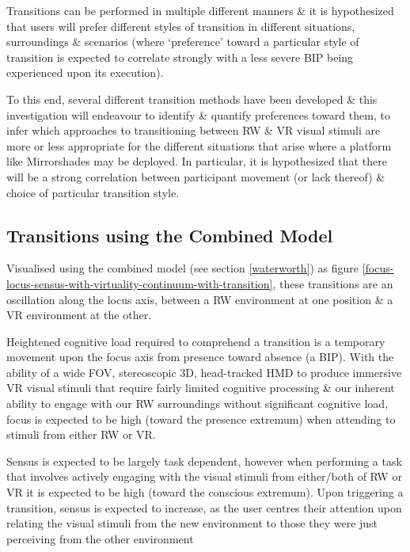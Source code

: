 Transitions can be performed in multiple different manners \& it is hypothesized that users will prefer different styles of transition in different situations, surroundings \& scenarios (where `preference' toward a particular style of transition is expected to correlate strongly with a less severe BIP being experienced upon its execution).

To this end, several different transition methods have been developed \& this investigation will endeavour to identify \& quantify preferences toward them, to infer which approaches to transitioning between RW \& VR visual stimuli are more or less appropriate for the different situations that arise where a platform like Mirrorshades may be deployed. In particular, it is hypothesized that there will be a strong correlation between participant movement (or lack thereof) \& choice of particular transition style.

\subsection{Transitions using the Combined Model}
Visualised using the combined model (see section \ref{waterworth}) as figure \ref{focus-locus-sensus-with-virtuality-continuum-with-transition}, these transitions are an oscillation along the locus axis, between a RW environment at one position \& a VR environment at the other.

Heightened cognitive load required to comprehend a transition is a temporary movement upon the focus axis from presence toward absence (a BIP). With the ability of a wide FOV, stereoscopic 3D, head-tracked HMD to produce immersive VR visual stimuli that require fairly limited cognitive processing \& our inherent ability to engage with our RW surroundings without significant cognitive load, focus is expected to be high (toward the presence extremum) when attending to stimuli from either RW or VR.

Sensus is expected to be largely task dependent, however when performing a task that involves actively engaging with the visual stimuli from either/both of RW or VR it is expected to be high (toward the conscious extremum). Upon triggering a transition, sensus is expected to increase, as the user centres their attention upon relating the visual stimuli from the new environment to those they were just perceiving from the other environment

